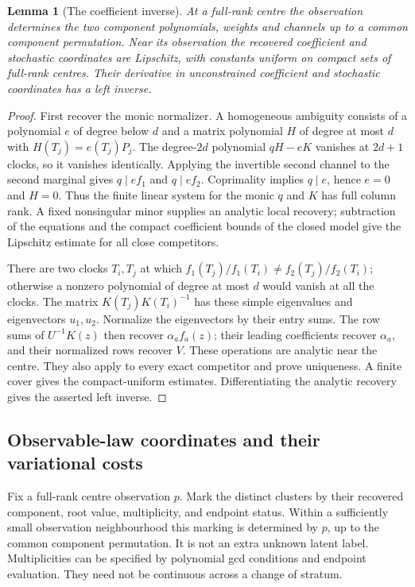 \documentclass[11pt,reqno]{amsart}
\numberwithin{equation}{section}
\newtheorem{lemma}[theorem]{Lemma}
\theoremstyle{definition}
\theoremstyle{remark}
\begin{document}
\begin{lemma}[The coefficient inverse]\label{lem:inverse}
At a full-rank centre the observation determines the two component polynomials, weights and channels up to a common component permutation. Near its observation the recovered coefficient and stochastic coordinates are Lipschitz, with constants uniform on compact sets of full-rank centres. Their derivative in unconstrained coefficient and stochastic coordinates has a left inverse.
\end{lemma}
\begin{proof}
First recover the monic normalizer. A homogeneous ambiguity consists of a polynomial $e$ of degree below $d$ and a matrix polynomial $H$ of degree at most $d$ with $H(T_j)=e(T_j)P_j$. The degree-$2d$ polynomial $qH-eK$ vanishes at $2d+1$ clocks, so it vanishes identically. Applying the invertible second channel to the second marginal gives $q\mid ef_1$ and $q\mid ef_2$. Coprimality implies $q\mid e$, hence $e=0$ and $H=0$. Thus the finite linear system for the monic $q$ and $K$ has full column rank. A fixed nonsingular minor supplies an analytic local recovery; subtraction of the equations and the compact coefficient bounds of the closed model give the Lipschitz estimate for all close competitors.

There are two clocks $T_i,T_j$ at which $f_1(T_j)/f_1(T_i)\ne f_2(T_j)/f_2(T_i)$; otherwise a nonzero polynomial of degree at most $d$ would vanish at all the clocks. The matrix $K(T_j)K(T_i)^{-1}$ has these simple eigenvalues and eigenvectors $u_1,u_2$. Normalize the eigenvectors by their entry sums. The row sums of $U^{-1}K(z)$ then recover $\alpha_af_a(z)$; their leading coefficients recover $\alpha_a$, and their normalized rows recover $V$. These operations are analytic near the centre. They also apply to every exact competitor and prove uniqueness. A finite cover gives the compact-uniform estimates. Differentiating the analytic recovery gives the asserted left inverse.
\end{proof}

\subsection{Observable-law coordinates and their variational costs}
Fix a full-rank centre observation $p$. Mark the distinct clusters by their recovered component, root value, multiplicity, and endpoint status. Within a sufficiently small observation neighbourhood this marking is determined by $p$, up to the common component permutation. It is not an extra unknown latent label. Multiplicities can be specified by polynomial gcd conditions and endpoint evaluation. They need not be continuous across a change of stratum.
\end{document}
